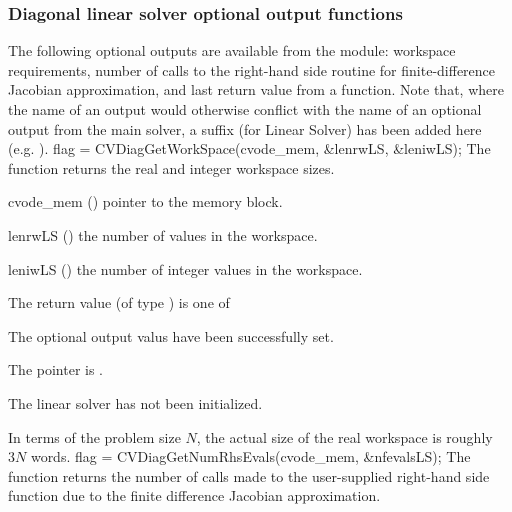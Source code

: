 \subsubsection{Diagonal linear solver optional output functions}
\label{sss:optout_diag}
The following optional outputs are available from the {\cvdiag} module:
workspace requirements, number of calls to the right-hand side routine for 
finite-difference Jacobian approximation, and last return value from a 
{\cvdiag} function.
Note that, where the name of an output would otherwise conflict with
the name of an optional output from the main solver, a suffix 
(for Linear Solver) has been added here (e.g.  ).
{
  flag = CVDiagGetWorkSpace(cvode\_mem, \&lenrwLS, \&leniwLS);
}
{
  The function  returns the
  {\cvdiag} real and integer workspace sizes.
}
{
  \begin{args}
  \item[cvode\_mem] ()
    pointer to the {\cvode} memory block.
  \item[lenrwLS] ()
    the number of  values in the {\cvdiag} workspace.
  \item[leniwLS] ()
    the number of integer values in the {\cvdiag} workspace.
  \end{args}
}
{
  The return value  (of type ) is one of
  \begin{args}
  \item[\Id{CVDIAG\_SUCCESS}] 
    The optional output valus have been successfully set.
  \item[\Id{CVDIAG\_MEM\_NULL}]
    The  pointer is .
  \item[\Id{CVDIAG\_LMEM\_NULL}]
    The {\cvdiag} linear solver has not been initialized.
  \end{args}
}
{
  In terms of the problem size $N$, the actual size of the real workspace
  is roughly $3 N$  words.
}
{
  flag = CVDiagGetNumRhsEvals(cvode\_mem, \&nfevalsLS);
}
{
  The function  returns the
  number of calls made to the user-supplied right-hand side function due to the 
  finite difference Jacobian approximation.
}

